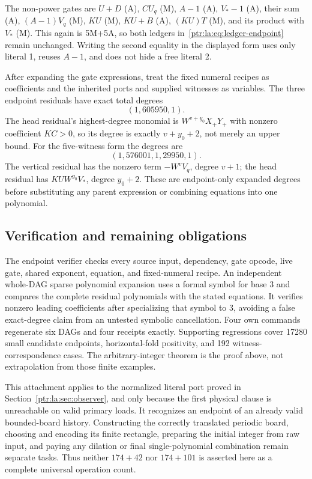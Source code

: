 \documentclass[11pt,letterpaper]{article}
\theoremstyle{definition}\newtheorem{definition}[theorem]{Definition}
\theoremstyle{remark}\newtheorem{remark}[theorem]{Remark}
\begin{document}
The non-power gates are $U+D$ (A), $CU_q$ (M), $A-1$ (A), $V_*-1$ (A), their sum (A), $(A-1)V_q$ (M), $KU$ (M), $KU+B$ (A), $(KU)T$ (M), and its product with $V_*$ (M). This again is 5M+5A, so both ledgers in~\eqref{ptr:la:eq:ledger-endpoint} remain unchanged. Writing the second equality in the displayed form uses only literal 1, reuses $A-1$, and does not hide a free literal 2.

After expanding the gate expressions, treat the fixed numeral recipes as coefficients and the inherited ports and supplied witnesses as variables. The three endpoint residuals have exact total degrees
\[
 (1,605950,1).
\]
The head residual's highest-degree monomial is $W^{v+y_0}X_+Y_+$ with nonzero coefficient $KC>0$, so its degree is exactly $v+y_0+2$, not merely an upper bound. For the five-witness form the degrees are
\[
 (1,576001,1,29950,1).
\]
The vertical residual has the nonzero term $-W^vV_q$, degree $v+1$; the head residual has $KUW^{y_0}V_*$, degree $y_0+2$. These are endpoint-only expanded degrees before substituting any parent expression or combining equations into one polynomial.

\subsection{Verification and remaining obligations}
The endpoint verifier checks every source input, dependency, gate opcode, live gate, shared exponent, equation, and fixed-numeral recipe. An independent whole-DAG sparse polynomial expansion uses a formal symbol for base 3 and compares the complete residual polynomials with the stated equations. It verifies nonzero leading coefficients after specializing that symbol to 3, avoiding a false exact-degree claim from an untested symbolic cancellation. Four own commands regenerate six DAGs and four receipts exactly. Supporting regressions cover 17280 small candidate endpoints, horizontal-fold positivity, and 192 witness-correspondence cases. The arbitrary-integer theorem is the proof above, not extrapolation from those finite examples.

This attachment applies to the normalized literal port proved in Section~\ref{ptr:la:sec:observer}, and only because the first physical clause is unreachable on valid primary loads. It recognizes an endpoint of an already valid bounded-board history. Constructing the correctly translated periodic board, choosing and encoding its finite rectangle, preparing the initial integer from raw input, and paying any dilation or final single-polynomial combination remain separate tasks. Thus neither $174+42$ nor $174+101$ is asserted here as a complete universal operation count.
\end{document}
